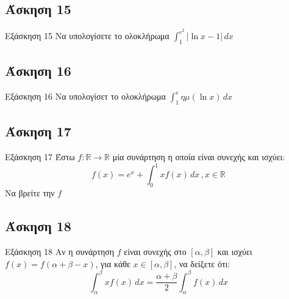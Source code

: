 \documentclass[greek]{beamer}
\begin{document}
\subsection{Άσκηση 15}
\begin{frame}[label=Άσκηση15,t]{Εξάσκηση 15}
  Να υπολογίσετε το ολοκλήρωμα $\int_{1}^{e^2} |\ln x-1| \,dx$

\end{frame}

\subsection{Άσκηση 16}
\begin{frame}[label=Άσκηση16,t]{Εξάσκηση 16}
  Να υπολογίσετ το ολοκλήρωμα $\int_{1}^{e} ημ(\ln x) \,dx$

\end{frame}

\subsection{Άσκηση 17}
\begin{frame}[label=Άσκηση17,t]{Εξάσκηση 17}
  Έστω $f:\mathbb{R}\to\mathbb{R}$ μία συνάρτηση η οποία είναι συνεχής και ισχύει:
  $$f(x)=e^x+\int_{0}^{1} xf(x) \,dx\, , x\in\mathbb{R}$$
  Να βρείτε την $f$

\end{frame}

\subsection{Άσκηση 18}
\begin{frame}[label=Άσκηση18,t]{Εξάσκηση 18}
  Αν η συνάρτηση $f$ είναι συνεχής στο $[α,β]$ και ισχύει $f(x)=f(α+β-x)$, για κάθε $x\in [α,β]$, να δείξετε ότι:
  $$\int_{α}^{β} xf(x) \,dx=\dfrac{α+β}{2}\int_{α}^{β} f(x) \,dx$$

\end{frame}


%
%
%
%
%
%
\end{document}
